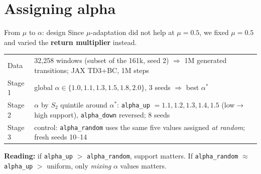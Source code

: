 \documentclass[aspectratio=169,11pt]{beamer}
\newcommand{\cond}[1]{\texttt{#1}}
\begin{document}
\section{Assigning alpha}
\begin{frame}{From $\mu$ to $\alpha$: design}
\small
Since $\mu$-adaptation did not help at $\mu=0.5$, we fixed $\mu=0.5$ and varied the \textbf{return multiplier} instead.
\vspace{0.3em}

\begin{tabularx}{\linewidth}{lY}
\toprule
Data & 32{,}258 windows (subset of the 161k, seed 2) $\Rightarrow$ 1M generated transitions; JAX TD3+BC, 1M steps\\
Stage 1 & global $\alpha\in\{1.0,1.1,1.3,1.5,1.8,2.0\}$, 3 seeds $\Rightarrow$ best $\alpha^*$\\
Stage 2 & $\alpha$ by $S_2$ quintile around $\alpha^*$: \cond{alpha\_up} $=1.1,1.2,1.3,1.4,1.5$ (low$\to$high support), \cond{alpha\_down} reversed; 8 seeds\\
Stage 3 & control: \cond{alpha\_random} uses the same five values assigned \emph{at random}; fresh seeds 10--14\\
\bottomrule
\end{tabularx}
\vspace{0.4em}

\textbf{Reading:} if \cond{alpha\_up} $>$ \cond{alpha\_random}, support matters. If \cond{alpha\_random} $\approx$ \cond{alpha\_up} $>$ uniform, only \emph{mixing} $\alpha$ values matters.
\end{frame}
\end{document}
